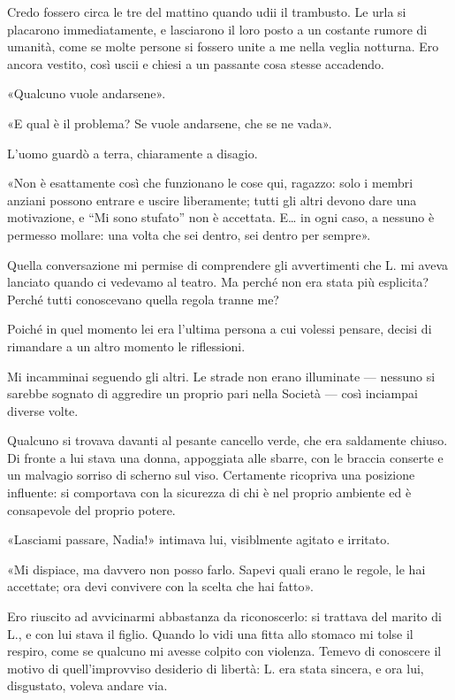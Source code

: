 \documentclass[a4paper,10pt]{memoir}
\begin{document}
Credo fossero circa le tre del mattino quando udii il trambusto. Le urla si placarono immediatamente, e lasciarono il
loro posto a un costante rumore di umanità, come se molte persone si fossero unite a me nella veglia notturna. Ero
ancora vestito, così uscii e chiesi a un passante cosa stesse accadendo.

«Qualcuno vuole andarsene».

«E qual è il problema? Se vuole andarsene, che se ne vada».

L'uomo guardò a terra, chiaramente a disagio.

«Non è esattamente così che funzionano le cose qui, ragazzo: solo i membri anziani possono entrare e uscire liberamente;
tutti gli altri devono dare una motivazione, e ``Mi sono stufato'' non è accettata. E\dots{} in ogni caso, a nessuno è
permesso mollare: una volta che sei dentro, sei dentro per sempre».

Quella conversazione mi permise di comprendere gli avvertimenti che L. mi aveva lanciato quando ci vedevamo al teatro.
Ma perché non era stata più esplicita? Perché tutti conoscevano quella regola tranne me?

Poiché in quel momento lei era l'ultima persona a cui volessi pensare, decisi di rimandare a un altro momento le
riflessioni.

Mi incamminai seguendo gli altri. Le strade non erano illuminate --- nessuno si sarebbe sognato di aggredire un proprio
pari nella Società --- così inciampai diverse volte.

Qualcuno si trovava davanti al pesante cancello verde, che era saldamente chiuso. Di fronte a lui stava una donna,
appoggiata alle sbarre, con le braccia conserte e un malvagio sorriso di scherno sul viso. Certamente ricopriva una
posizione influente: si comportava con la sicurezza di chi è nel proprio ambiente ed è consapevole del proprio potere.

«Lasciami passare, Nadia!» intimava lui, visiblmente agitato e irritato.

«Mi dispiace, ma davvero non posso farlo. Sapevi quali erano le regole, le hai accettate; ora devi convivere con la
scelta che hai fatto».

Ero riuscito ad avvicinarmi abbastanza da riconoscerlo: si trattava del marito di L., e con lui stava il figlio. Quando
lo vidi una fitta allo stomaco mi tolse il respiro, come se qualcuno mi avesse colpito con violenza. Temevo di conoscere
il motivo di quell'improvviso desiderio di libertà: L. era stata sincera, e ora lui, disgustato, voleva andare via.
\end{document}
